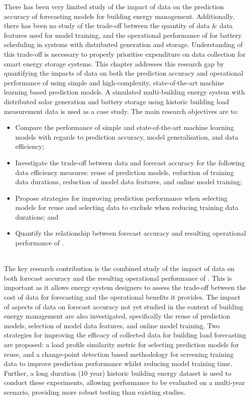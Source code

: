 There has been very limited study of the impact of data on the prediction accuracy of forecasting models for building energy management. Additionally, there has been no study of the trade-off between the quantity of data \& data features used for model training, and the operational performance of  for battery scheduling in systems with distributed generation and storage. Understanding of this trade-off is necessary to properly prioritise expenditure on data collection for smart energy storage systems.
This chapter addresses this research gap by quantifying the impacts of data on both the prediction accuracy and operational performance of  using simple and high-complexity, state-of-the-art machine learning based prediction models. A simulated multi-building energy system with distributed solar generation and battery storage using historic building load measurement data is used as a case study. The main research objectives are to:
\begin{itemize}
    \itemsep0em 
    \item Compare the performance of simple and state-of-the-art machine learning models with regards to prediction accuracy, model generalisation, and data efficiency;
    \item Investigate the trade-off between data and forecast accuracy for the following data efficiency measures: reuse of prediction models, reduction of training data durations, reduction of model data features, and online model training;
    \item Propose strategies for improving prediction performance when selecting models for reuse and selecting data to exclude when reducing training data durations; and
    \item Quantify the relationship between forecast accuracy and resulting operational performance of .
\end{itemize}
\hfill \\

The key research contribution is the combined study of the impact of data on both forecast accuracy and the resulting operational performance of . This is important as it allows energy system designers to assess the trade-off between the cost of data for forecasting and the operational benefits it provides. The impact of aspects of data on forecast accuracy not yet studied in the context of building energy management are also investigated, specifically the reuse of prediction models, selection of model data features, and online model training. Two strategies for improving the efficacy of collected data for building load forecasting are proposed: a load profile similarity metric for selecting prediction models for reuse, and a change-point detection based methodology for screening training data to improve prediction performance whilst reducing model training time. Further, a long duration (10 year) historic building energy dataset is used to conduct these experiments, allowing performance to be evaluated on a multi-year scenario, providing more robust testing than existing studies.

